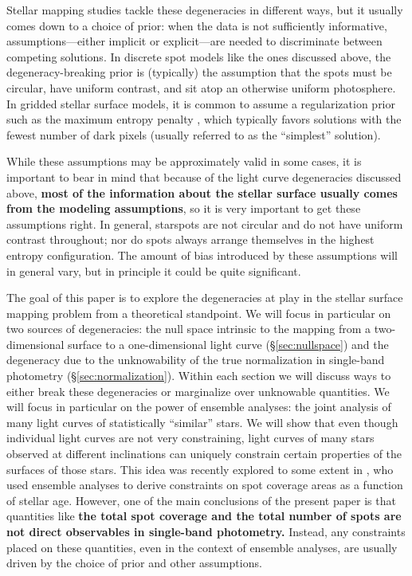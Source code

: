 \documentclass[modern]{aastex62}
\begin{document}
Stellar mapping studies tackle these degeneracies in different ways, but
it usually comes down to a choice of prior: when the data is not
sufficiently informative, assumptions---either implicit or explicit---are needed to discriminate
between competing solutions. In discrete spot models like the ones
discussed above, the degeneracy-breaking prior is (typically) the assumption that the
spots must be circular, have uniform contrast, and sit atop an otherwise
uniform photosphere. In gridded stellar surface models, it is common to
assume a regularization prior such as the maximum entropy penalty
\citep[e.g.,][]{Vogt1987}, which typically favors solutions with the fewest
number of dark pixels (usually referred to as the ``simplest'' solution).

While these assumptions may be approximately valid in some cases, it is
important to bear in mind that because of the light curve degeneracies discussed above,
\textbf{most of the information about the stellar surface usually comes from the modeling assumptions},
so it is very important to get these assumptions right. In general, starspots are not circular and do not have uniform
contrast throughout; nor do spots always arrange themselves in the highest
entropy configuration. The amount of bias introduced by these assumptions
will in general vary, but in principle it could be quite significant.


The goal of this paper is to explore the degeneracies at play in the
stellar surface mapping problem from a theoretical standpoint.
We will focus in particular on two sources of degeneracies: the
null space intrinsic to the mapping from a two-dimensional surface to
a one-dimensional light curve (\S\ref{sec:nullspace})
and the degeneracy due to the unknowability of the true normalization in
single-band photometry (\S\ref{sec:normalization}). Within each section we
will discuss ways to either break these degeneracies or marginalize
over unknowable quantities.
We will focus in particular on the power of ensemble analyses: the
joint analysis of many light curves of statistically ``similar''
stars. We will show that even though individual light curves are not very
constraining, light curves of many stars
observed at different inclinations can uniquely constrain certain
properties of the surfaces of those stars.
%
This idea was recently explored to some extent
in \citet{Morris2020}, who used ensemble analyses to derive constraints on
spot coverage areas as a function of stellar age. However, one of
the main conclusions of the present paper is that
quantities like \textbf{the
    total spot coverage and the total number of
    spots are not direct observables in single-band photometry.} Instead,
any constraints placed on these quantities, even in the context of
ensemble analyses, are usually driven by the choice of prior and other assumptions.
\end{document}

